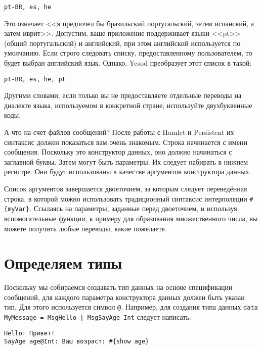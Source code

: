 \begin{lstlisting}
pt-BR, es, he
\end{lstlisting}

Это означает <<я предпочел бы бразильский португальский, затем испанский, а
затем иврит>>. Допустим, ваше приложение поддерживает языки <<pt>> (общий
португальский) и английский, при этом английский используется по умолчанию.
Если строго следовать списку, предоставленному пользователем, то будет выбран
английский язык. Однако, Yesod преобразует этот список в такой:

\begin{lstlisting}
pt-BR, es, he, pt
\end{lstlisting}

Другими словами, если только вы не предоставляете отдельные переводы на
диалекте языка, используемом в конкретной стране, используйте двухбуквенные
коды.

А что на счет файлов сообщений? После работы с Hamlet и Persistent их синтаксис
должен показаться вам очень знакомым. Строка начинается с имени сообщения.
Поскольку это конструктор данных, оно должно начинаться с заглавной буквы.
Затем могут быть параметры. Их следует набирать в нижнем регистре. Они будут
использованы в качестве аргументов конструктора данных.

Список аргументов завершается двоеточием, за которым следует переведённая
строка, в которой можно использовать традиционный синтаксис интерполяции
\lstinline'#{myVar}'. Ссылаясь на параметры, заданные перед двоеточием, и
используя вспомогательные функции, к примеру для образования множественного
числа, вы можете получить любые переводы, какие пожелаете.

\section{Определяем типы} %

Поскольку мы собираемся создавать тип данных на основе спецификации сообщений,
для каждого параметра конструктора данных должен быть указан тип. Для этого
используется символ \verb'@'. Например, для создания типа данных
\lstinline'data MyMessage = MsgHello | MsgSayAge Int' следует написать:

\begin{lstlisting}
Hello: Привет!
SayAge age@Int: Ваш возраст: #{show age}
\end{lstlisting}

